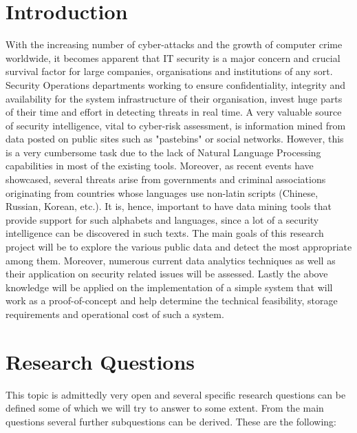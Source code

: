 \documentclass[12pt]{article}
\begin{document}
\tableofcontents

\newpage

\section*{Introduction}
\parbox{\linewidth}{
With the increasing number of cyber-attacks and the growth of computer crime worldwide, it becomes apparent that IT security is a major concern and crucial survival factor for large companies, organisations and institutions of any sort. Security Operations departments working to ensure confidentiality, integrity and availability for the system infrastructure of their organisation, invest huge parts of their time and effort in detecting threats in real time. A very valuable source of security intelligence, vital to cyber-risk assessment, is information mined from data posted on public sites such as "pastebins" or social networks. However, this is a very cumbersome task due to the lack of Natural Language Processing capabilities in most of the existing tools. Moreover, as recent events have showcased, several threats arise from governments and criminal associations originating from countries whose languages use non-latin scripts (Chinese, Russian, Korean, etc.). It is, hence, important to have data mining tools that provide support for such alphabets and languages, since a lot of a security intelligence can be discovered in such texts. The main goals of this research project will be to explore the various public data and detect the most appropriate among them. Moreover, numerous current data analytics techniques as well as their application on security related issues will be assessed. Lastly the above knowledge will be applied on the implementation of a simple system that will work as a proof-of-concept and help determine the technical feasibility, storage requirements and operational cost of such a system.  
}
\section{Research Questions}
This topic is admittedly very open and several specific research questions can be defined some of which we will try to answer to some extent. From the main questions several further subquestions can be derived. These are the following:
\end{document}
